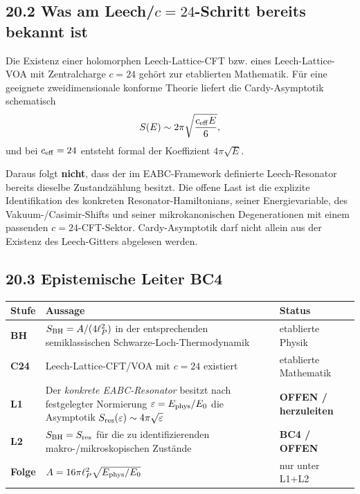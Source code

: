 \documentclass[11pt,a4paper]{article}
\begin{document}
\subsection*{20.2 Was am Leech/$c=24$-Schritt bereits bekannt ist}
Die Existenz einer holomorphen Leech-Lattice-CFT bzw. eines Leech-Lattice-VOA mit Zentralcharge $c=24$ gehört zur etablierten Mathematik. Für eine geeignete zweidimensionale konforme Theorie liefert die Cardy-Asymptotik schematisch
\[
S(E)\sim 2\pi\sqrt{\frac{c_{\rm eff}E}{6}},
\]
und bei $c_{\rm eff}=24$ entsteht formal der Koeffizient $4\pi\sqrt{E}$.

\begin{warningbox}
Daraus folgt \textbf{nicht}, dass der im EABC-Framework definierte Leech-Resonator bereits dieselbe Zustandzählung besitzt. Die offene Last ist die explizite Identifikation des konkreten Resonator-Hamiltonians, seiner Energievariable, des Vakuum-/Casimir-Shifts und seiner mikrokanonischen Degenerationen mit einem passenden $c=24$-CFT-Sektor. Cardy-Asymptotik darf nicht allein aus der Existenz des Leech-Gitters abgelesen werden.
\end{warningbox}

\subsection*{20.3 Epistemische Leiter BC4}
\begin{center}
\renewcommand{\arraystretch}{1.22}
\begin{tabularx}{\textwidth}{>{\bfseries}p{1.3cm} X p{3.0cm}}
\toprule
Stufe & Aussage & Status\\
\midrule
BH & $S_{\rm BH}=A/(4\ell_P^2)$ in der entsprechenden semiklassischen Schwarze-Loch-Thermodynamik & etablierte Physik\\
C24 & Leech-Lattice-CFT/VOA mit $c=24$ existiert & etablierte Mathematik\\
L1 & Der \emph{konkrete EABC-Resonator} besitzt nach festgelegter Normierung $\varepsilon=E_{\rm phys}/E_0$ die Asymptotik $S_{\rm res}(\varepsilon)\sim4\pi\sqrt{\varepsilon}$ & \textbf{OFFEN / herzuleiten}\\
L2 & $S_{\rm BH}=S_{\rm res}$ für die zu identifizierenden makro-/mikroskopischen Zustände & \textbf{BC4 / OFFEN}\\
Folge & $A=16\pi\ell_P^2\sqrt{E_{\rm phys}/E_0}$ & nur unter L1+L2\\
\bottomrule
\end{tabularx}
\end{center}
\end{document}
